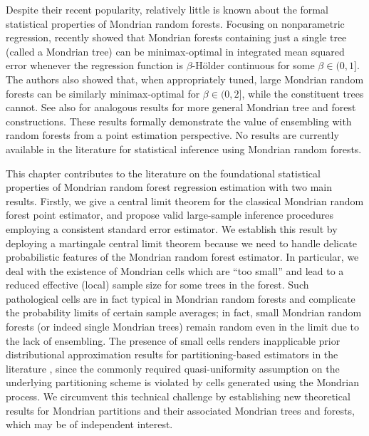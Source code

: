 \documentclass[11pt,lof]{puthesis}
\theoremstyle{break}
\theoremstyle{proof}
\begin{document}
Despite their recent popularity, relatively little is known about the formal
statistical properties of Mondrian random forests. Focusing on nonparametric
regression, \citet{mourtada2020minimax} recently showed that Mondrian forests
containing just a single tree (called a Mondrian tree) can be minimax-optimal
in integrated mean squared error whenever the regression function is
$\beta$-H{\"o}lder continuous for some $\beta \in (0, 1]$. The authors also
showed that, when appropriately tuned, large Mondrian random forests can be
similarly minimax-optimal for $\beta \in (0, 2]$, while the constituent trees
cannot. See also \citet{oreilly2022stochastic} for analogous results for more
general Mondrian tree and forest constructions. These results formally
demonstrate the value of ensembling with random forests from a point estimation
perspective. No results are currently available in the literature for
statistical inference using Mondrian random forests.

This chapter contributes to the literature on the foundational statistical
properties of Mondrian random forest regression estimation with two main
results. Firstly, we give a central limit theorem for the classical Mondrian
random forest point estimator, and propose valid large-sample inference
procedures employing a consistent standard error estimator. We establish this
result by deploying a martingale central limit theorem
\citep[Theorem~3.2]{hall1980martingale} because we need to handle delicate
probabilistic features of the Mondrian random forest estimator. In particular,
we deal with the existence of Mondrian cells which are ``too small'' and lead
to a reduced effective (local) sample size for some trees in the forest. Such
pathological cells are in fact typical in Mondrian random forests and
complicate the probability limits of certain sample averages; in fact, small
Mondrian random forests (or indeed single Mondrian trees) remain random even
in the limit due to the lack of ensembling. The presence of small cells
renders inapplicable prior distributional approximation results for
partitioning-based estimators in the literature
\citep{huang2003local,cattaneo2020large}, since the commonly required
quasi-uniformity assumption on the underlying partitioning scheme is violated
by cells generated using the Mondrian process. We circumvent this
technical challenge by establishing new theoretical results for Mondrian
partitions and their associated Mondrian trees and forests, which may be of
independent interest.
\end{document}
